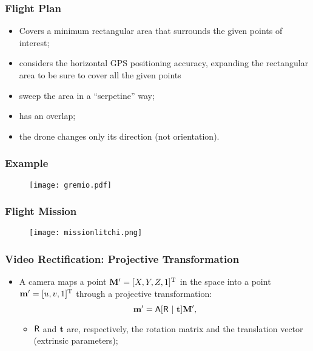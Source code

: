 \documentclass{beamer}
\begin{document}
		\begin{frame}\frametitle{Flight Plan}
			\begin{itemize}
				\item Covers a minimum rectangular area that surrounds the given points of interest;
				\item considers the horizontal GPS positioning accuracy, expanding the rectangular area to be sure to cover all the given points
				\item sweep the area in a ``serpetine'' way;
				\item has an overlap;
				\item the drone changes only its direction (not orientation).
			\end{itemize}
		\end{frame}


		\begin{frame}
			\frametitle{Example}
			\begin{figure}
				\centering
				\texttt{[image: gremio.pdf]}
			\end{figure}
		\end{frame}




		\begin{frame}
			\frametitle{Flight Mission}
			\begin{figure}
				\centering
				\texttt{[image: missionlitchi.png]}
			\end{figure}
		\end{frame}


		\begin{frame}\frametitle{Video Rectification: Projective Transformation}
			\begin{itemize}
			 \item  A camera maps a point $\mathbf{M}' = [X,Y,Z,1]^{\mathrm{T}}$ in the space into a point $\mathbf{m}' = [u,v,1]^{\mathrm{T}}$ through a projective transformation:
			 \begin{equation*}
			\label{eq:projection}
			\mathbf{m}' = \mathsf{A}[\mathsf{R}~|~\mathbf{t}]\mathbf{M}',
			\end{equation*}
			\begin{itemize}
			 \item $\mathsf{R}$ and $\mathbf{t}$ are, respectively, the rotation matrix and the translation vector (extrinsic parameters);%
			\end{itemize}
			\end{itemize}
		\end{frame}
\end{document}
